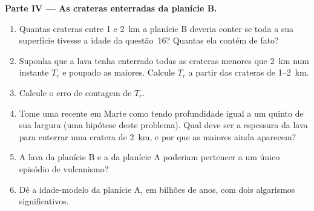 \begin{problem}
\medskip\noindent\textbf{Parte IV --- As crateras enterradas da planície B.}
\begin{enumerate}[resume]
\item Quantas crateras entre \num{1} e \qty{2}{km} a planície B deveria conter se
  toda a sua superfície tivesse a idade da questão~16? Quantas ela contém de fato?
\item Suponha que a lava tenha enterrado todas as crateras menores que \qty{2}{km} num
  instante $T_r$ e poupado as maiores. Calcule $T_r$ a partir das
  crateras de \num{1}--\qty{2}{km}.
\item Calcule o erro de contagem de $T_r$.
\item Tome uma  recente em Marte como tendo profundidade igual a um quinto de sua
  largura (uma hipótese deste problema). Qual deve ser a espessura da lava para enterrar
  uma cratera de \qty{2}{km}, e por que as maiores ainda aparecem?
\item A lava da planície B e a da planície A poderiam pertencer a um único episódio
  de vulcanismo?
\item Dê a idade-modelo da planície A, em bilhões de anos, com dois
  algarismos significativos.
\end{enumerate}
\end{problem}
